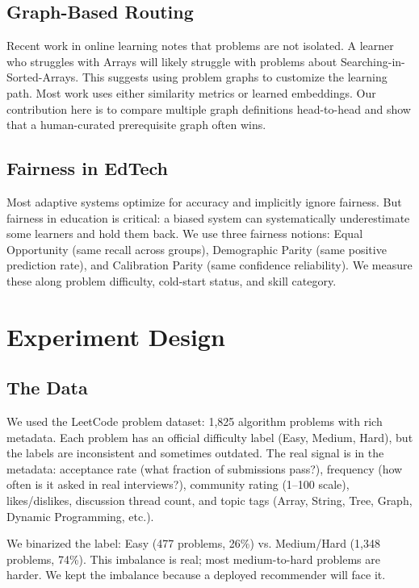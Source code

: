\documentclass[conference]{IEEEtran}
\begin{document}
\subsection{Graph-Based Routing}

Recent work in online learning notes that problems are not isolated. A learner who struggles with Arrays will likely struggle with problems about Searching-in-Sorted-Arrays. This suggests using problem graphs to customize the learning path. Most work uses either similarity metrics or learned embeddings. Our contribution here is to compare multiple graph definitions head-to-head and show that a human-curated prerequisite graph often wins.

\subsection{Fairness in EdTech}

Most adaptive systems optimize for accuracy and implicitly ignore fairness. But fairness in education is critical: a biased system can systematically underestimate some learners and hold them back. We use three fairness notions: Equal Opportunity (same recall across groups), Demographic Parity (same positive prediction rate), and Calibration Parity (same confidence reliability). We measure these along problem difficulty, cold-start status, and skill category.

\section{Experiment Design}

\subsection{The Data}

We used the LeetCode problem dataset: 1,825 algorithm problems with rich metadata. Each problem has an official difficulty label (Easy, Medium, Hard), but the labels are inconsistent and sometimes outdated. The real signal is in the metadata: acceptance rate (what fraction of submissions pass?), frequency (how often is it asked in real interviews?), community rating (1--100 scale), likes/dislikes, discussion thread count, and topic tags (Array, String, Tree, Graph, Dynamic Programming, etc.).

We binarized the label: Easy (477 problems, 26\%) vs. Medium/Hard (1,348 problems, 74\%). This imbalance is real; most medium-to-hard problems are harder. We kept the imbalance because a deployed recommender will face it.
\end{document}
